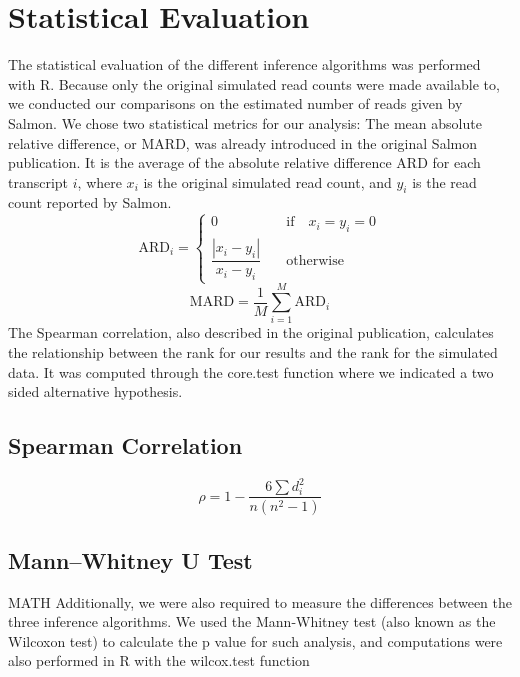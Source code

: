 \section{Statistical Evaluation}
The statistical evaluation of the different inference algorithms was performed with R. 
Because only the original simulated read counts were made available to, we conducted our comparisons on the estimated number of reads 
given by Salmon. We chose two statistical metrics for our analysis:
The mean absolute relative difference, or $\mathrm{MARD}$, 
was already introduced in the original Salmon publication. 
It is the average of the absolute relative difference $\mathrm{ARD}$ for each transcript $i$, 
where $x_i$ is the original simulated read count, and $y_i$ is the read count reported by Salmon.
\[
    \mathrm{ARD}_i = \begin{cases}
        0 &\quad\text{if}\quad x_i = y_i = 0\\
        \dfrac{\left| x_i-y_i \right| }{x_i-y_i} &\quad\text{otherwise}\quad
    \end{cases}
\]
\[
    \mathrm{MARD} = \frac{1}{M} \sum^{M}_{i = 1}\mathrm{ARD}_i
\]
The Spearman correlation, also described in the original publication, calculates the relationship between the rank for our results and the rank for the simulated data. It was computed through the core.test function where we indicated a two sided alternative hypothesis.


\subsection{Spearman Correlation}
\[
    \rho = 1 - \dfrac{6 \sum{d^2_i}}{n(n^2-1)}
\]
\subsection{Mann–Whitney U Test}

MATH
Additionally, we were also required to measure the differences between the three inference algorithms. 
We used the Mann-Whitney test (also known as the Wilcoxon test) 
to calculate the p value for such analysis, and computations were also performed in R 
with the wilcox.test function
